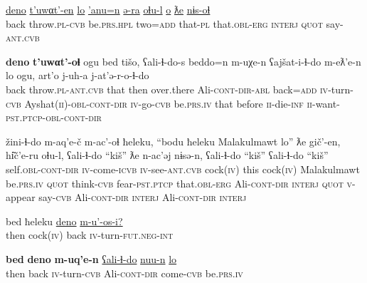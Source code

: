 \documentclass[output=paper]{LSP/langsci}
\begin{document}
\ea

\gll \underline{deno} \underline{t’uwαt’-en} \underline{lo} \underline{’anu=n} \underline{ə-ra} \underline{oɬu-l} \underline{o} \underline{ƛe} \underline{nɨs-oɬ}\\
back throw.\textsc{pl-cvb} be.\textsc{prs.hpl} two=\textsc{add} that-\textsc{pl} that.\textsc{obl-erg} \textsc{interj} \textsc{quot} say-\textsc{ant.cvb} \\
\glt {}
\z

\ea

\gll \textbf{deno} \textbf{t’uwαt’-oɬ} ogu bed tišo, ʕali-ɬ-do-s beddo=n m-uχe-n ʕajšat-i-ɬ-do m-eƛ’e-n lo ogu, art’o j-uh-a j-at’ə-r-o-ɬ-do\\
back throw.\textsc{pl-ant.cvb} that then over.there Ali-\textsc{cont-dir-abl} back=\textsc{add} \textsc{iv}-turn-\textsc{cvb} Ayshat(\textsc{ii})-\textsc{obl-cont-dir} \textsc{iv}-go-\textsc{cvb} be.\textsc{prs.iv} that before \textsc{ii}-die-\textsc{inf} \textsc{ii}-want-\textsc{pst.ptcp-obl-cont-dir} \\
\glt {}
\z

\ea

\gll žini-ɬ-do m-aq’e-č m-ac’-oɬ ħeleku, “bodu ħeleku Malakulmawt lo” ƛe gič’-en, hi͂č’e-ru oɬu-l, ʕali-ɬ-do “kiš” ƛe n-ac’əj nɨsə-n, ʕali-ɬ-do “kiš” ʕali-ɬ-do “kiš”\\
self.\textsc{obl-cont-dir} \textsc{iv}-come-\textsc{icvb} \textsc{iv}-see-\textsc{ant.cvb} cock(\textsc{iv}) this cock(\textsc{iv}) Malakulmawt be.\textsc{prs.iv} \textsc{quot} think-\textsc{cvb} fear-\textsc{pst.ptcp} that.\textsc{obl-erg} Ali-\textsc{cont-dir} \textsc{interj} \textsc{quot} \textsc{v}-appear say-\textsc{cvb} Ali-\textsc{cont-dir} \textsc{interj} Ali-\textsc{cont-dir} \textsc{interj} \\
\glt {}
\z

\ea

\gll  bed	ħeleku	\underline{deno}	\underline{m-u'-os-i?}\\
then	cock(\textsc{iv})	back	\textsc{iv}-turn-\textsc{fut.neg-int} \\
\glt {}
\z

\ea

\gll  \textbf{bed} 	\textbf{deno}		\textbf{m-uq'e-n}		\underline{ʕali-ɬ-do}			\underline{nuu-n}			\underline{lo}\\
then	back		\textsc{iv}-turn-\textsc{cvb}	Ali-\textsc{cont-dir}	come-\textsc{cvb}	be.\textsc{prs.iv} \\
\glt {}
\z
\end{document}
